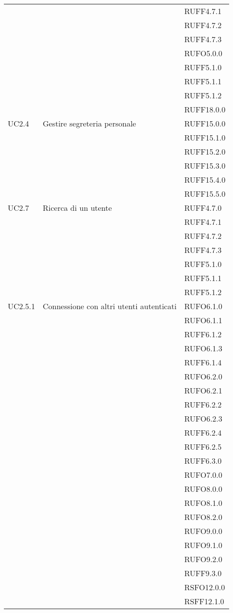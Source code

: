 \begin{center}
\begin{longtable}{lp{}l}
 &  & RUFF4.7.1 \\
 &  & RUFF4.7.2 \\
 &  & RUFF4.7.3 \\
 &  & RUFO5.0.0 \\
 &  & RUFF5.1.0 \\
 &  & RUFF5.1.1 \\
 &  & RUFF5.1.2 \\
 &  & RUFF18.0.0 \\
UC2.4 & Gestire segreteria personale & RUFF15.0.0 \\
 &  & RUFF15.1.0 \\
 &  & RUFF15.2.0 \\
 &  & RUFF15.3.0 \\
 &  & RUFF15.4.0 \\
 &  & RUFF15.5.0 \\
UC2.7 & Ricerca di un utente & RUFF4.7.0 \\
 &  & RUFF4.7.1 \\
 &  & RUFF4.7.2 \\
 &  & RUFF4.7.3 \\
 &  & RUFF5.1.0 \\
 &  & RUFF5.1.1 \\
 &  & RUFF5.1.2 \\
UC2.5.1 & Connessione con altri utenti autenticati & RUFO6.1.0 \\
 &  & RUFO6.1.1 \\
 &  & RUFF6.1.2 \\
 &  & RUFO6.1.3 \\
 &  & RUFF6.1.4 \\
 &  & RUFO6.2.0 \\
 &  & RUFO6.2.1 \\
 &  & RUFF6.2.2 \\
 &  & RUFO6.2.3 \\
 &  & RUFF6.2.4 \\
 &  & RUFF6.2.5 \\
 &  & RUFF6.3.0 \\
 &  & RUFO7.0.0 \\
 &  & RUFO8.0.0 \\
 &  & RUFO8.1.0 \\
 &  & RUFO8.2.0 \\
 &  & RUFO9.0.0 \\
 &  & RUFO9.1.0 \\
 &  & RUFO9.2.0 \\
 &  & RUFF9.3.0 \\
 &  & RSFO12.0.0 \\
 &  & RSFF12.1.0 \\

\end{longtable}
\end{center}

